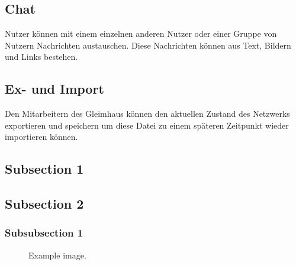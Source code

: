 \documentclass[12pt]{article} %
\begin{document}
\subsection{Chat}
Nutzer können mit einem einzelnen anderen Nutzer oder einer Gruppe von Nutzern Nachrichten austauschen. Diese Nachrichten können aus Text, Bildern und Links bestehen.

\subsection{Ex- und Import}
Den Mitarbeitern des Gleimhaus können den aktuellen Zustand des Netzwerks exportieren und speichern um diese Datei zu einem späteren Zeitpunkt wieder importieren können.

\subsection{Subsection 1} %

\lipsum[1] %


\subsection{Subsection 2} %

\lipsum[2] %


\subsubsection{Subsubsection 1} %

\lipsum[3] %

\begin{figure}[H] %
\caption{Example image.}
\label{fig:speciation}
\end{figure}
\end{document}
